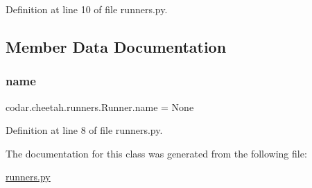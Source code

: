 Definition at line 10 of file runners.\+py.



\subsection{Member Data Documentation}
\mbox{\label{classcodar_1_1cheetah_1_1runners_1_1_runner_aa2c0d84fbe4396e2a42cb84923c3a264}} 
\subsubsection{\texorpdfstring{name}{name}}
{\footnotesize\ttfamily codar.\+cheetah.\+runners.\+Runner.\+name = None\hspace{0.3cm}{\ttfamily [static]}}



Definition at line 8 of file runners.\+py.



The documentation for this class was generated from the following file\+:\begin{DoxyCompactItemize}
\item 
\hyperlink{runners_8py}{runners.\+py}\end{DoxyCompactItemize}
